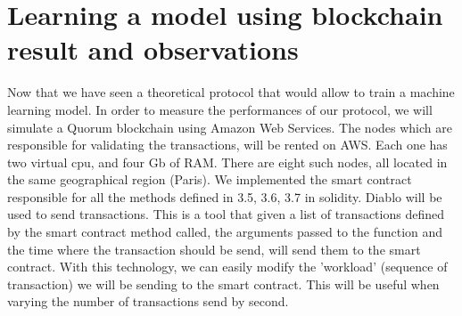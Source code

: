 \documentclass{article}
\begin{document}
\section{Learning a model using blockchain result and observations}
Now that we have seen a theoretical protocol that would allow to train a machine learning model.
In order to measure the performances of our protocol, we will simulate a Quorum blockchain using Amazon Web Services.
The nodes which are responsible for validating the transactions, will be rented on AWS. Each one has two virtual cpu, and
four Gb of RAM. There are eight such nodes, all located in the same geographical region (Paris). We implemented the
smart contract responsible for all the methods defined in {3.5, 3.6, 3.7} in solidity. Diablo will be used to send
transactions. This is a tool that given a list of transactions defined by the smart contract method
called, the arguments passed to the function and the time where the transaction should be send, will send them to the
smart contract. With this technology, we can easily modify the 'workload' (sequence of transaction) we will be sending
to the smart contract. This will be useful when varying the number of transactions send by second.
\end{document}
